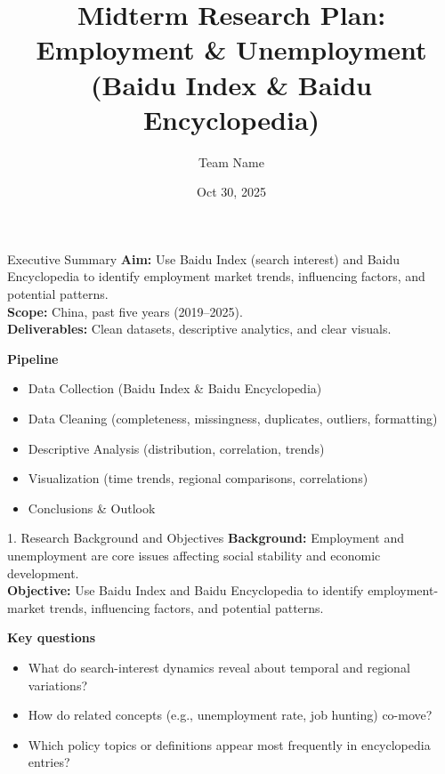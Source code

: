 \documentclass[aspectratio=169,11pt]{beamer}
\title[Employment \& Unemployment (Baidu Index \& Baike)]%
{Midterm Research Plan: Employment \& Unemployment (Baidu Index \& Baidu Encyclopedia)}
\author{Team Name} %
\institute{Course: Data Science and AI}
\date[Oct 30, 2025]{Oct 30, 2025}
\begin{document}
	
	\begin{frame}
		\titlepage
	\end{frame}
	
	\begin{frame}{Executive Summary}
		\small
		\textbf{Aim:} Use Baidu Index (search interest) and Baidu Encyclopedia to identify employment market trends, influencing factors, and potential patterns. \\
		\textbf{Scope:} China, past five years (2019--2025). \\
		\textbf{Deliverables:} Clean datasets, descriptive analytics, and clear visuals.
		\medskip
		
		\textbf{Pipeline}
		\begin{itemize}
			\item Data Collection (Baidu Index \& Baidu Encyclopedia)
			\item Data Cleaning (completeness, missingness, duplicates, outliers, formatting)
			\item Descriptive Analysis (distribution, correlation, trends)
			\item Visualization (time trends, regional comparisons, correlations)
			\item Conclusions \& Outlook
		\end{itemize}
	\end{frame}
	
	\begin{frame}{1. Research Background and Objectives}
		\small
		\textbf{Background:} Employment and unemployment are core issues affecting social stability and economic development. \\
		\textbf{Objective:} Use Baidu Index and Baidu Encyclopedia to identify employment-market trends, influencing factors, and potential patterns.
		\medskip
		
		\textbf{Key questions}
		\begin{itemize}
			\item What do search-interest dynamics reveal about temporal and regional variations?
			\item How do related concepts (e.g., unemployment rate, job hunting) co-move?
			\item Which policy topics or definitions appear most frequently in encyclopedia entries?
		\end{itemize}
	\end{frame}
	
\end{document}
